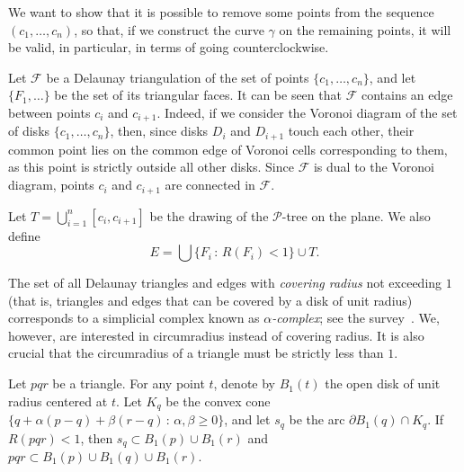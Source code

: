 \begin{appendices}
We want to show that it is possible to remove some points from the sequence $(c_1, \ldots, c_n)$, so that, if we construct the curve $\gamma$ on the remaining points, it will be valid, in particular, in terms of going counterclockwise.

Let $\mathcal{F}$ be a Delaunay triangulation of the set of points $\{c_1, \ldots, c_n\}$, and let $\{F_1, \ldots\}$ be the set of its triangular faces.
It can be seen that $\mathcal{F}$ contains an edge between points $c_i$ and $c_{i+1}$. Indeed, if we consider the Voronoi diagram of the set of disks $\{c_1, \ldots, c_n\}$, then, since disks $D_i$ and $D_{i+1}$ touch each other, their common point lies on the common edge of Voronoi cells corresponding to them, as this point is strictly outside all other disks. Since $\mathcal{F}$ is dual to the Voronoi diagram, points $c_i$ and $c_{i+1}$ are connected in $\mathcal{F}$.

Let $T = \bigcup_{i=1}^n[c_i, c_{i+1}]$ be the drawing of the $\mathcal{P}$-tree on the plane. We also define $$E = \bigcup\{F_i\,\colon\, R(F_i) < 1\}\cup T.$$

\begin{remark}The set of all Delaunay triangles and edges with \emph{covering radius} not exceeding $1$ (that is, triangles and edges that can be covered by a disk of unit radius) corresponds to a simplicial complex known as \emph{$\alpha$-complex}; see the survey~\cite{alpha_shapes}. We, however, are interested in circumradius instead of covering radius. It is also crucial that the circumradius of a triangle must be strictly less than $1$.
\end{remark}

\begin{lemma}\label{lemma:small-R-is-good}
Let $pqr$ be a triangle. For any point $t$, denote by $B_1(t)$ the open disk of unit radius centered at $t$. Let $K_q$ be the convex cone $\{q + \alpha(p - q) + \beta(r - q)\,\colon\,\alpha, \beta\geq 0\}$, and let $s_q$ be the arc $\partial B_1(q)\cap K_q$. If $R(pqr) < 1$, then $s_q\subset B_1(p)\cup B_1(r)$ and $pqr\subset B_1(p)\cup B_1(q)\cup B_1(r)$.
\end{lemma}


\end{appendices}
